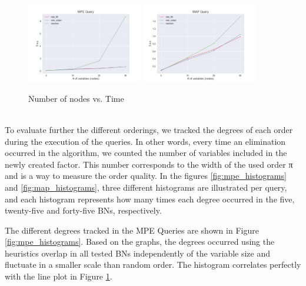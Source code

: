 \intextsep
\begin{figure}[H]
    \centering
    \includegraphics[width=0.45\textwidth]{Assets/mpe_query.png}
    \includegraphics[width=0.45\textwidth]{Assets/map_query.png}
    \caption{Number of nodes vs. Time}
    \label{fig:time_nodes}
\end{figure}\\



To evaluate further the different orderings,  we tracked the degrees of each order during the execution of the queries. In other words, every time an elimination occurred in the algorithm, we counted the number of variables included in the newly created factor. This number corresponds to the width of the used order π and is a way to measure the order quality. In the figures \ref{fig:mpe_histograms} and \ref{fig:map_histograms}, three different histograms are illustrated per query, and each histogram represents how many times each degree occurred in the five, twenty-five and forty-five BNs, respectively.

The different degrees tracked in the MPE Queries are shown in Figure \ref{fig:mpe_histograms}. Based on the graphs, the degrees occurred using the heuristics overlap in all tested BNs independently of the variable size and fluctuate in a smaller scale than random order. The histogram correlates perfectly with the line plot in Figure \ref{fig:time_nodes}.

